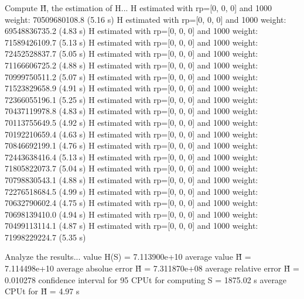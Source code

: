 Compute H̃, the estimation of H...
  H estimated with rp=[0, 0, 0] and 1000 weight:  70509680108.8  (5.16 s)
  H estimated with rp=[0, 0, 0] and 1000 weight:  69548836735.2  (4.83 s)
  H estimated with rp=[0, 0, 0] and 1000 weight:  71589426109.7  (5.13 s)
  H estimated with rp=[0, 0, 0] and 1000 weight:  72452528837.7  (5.05 s)
  H estimated with rp=[0, 0, 0] and 1000 weight:  71166606725.2  (4.88 s)
  H estimated with rp=[0, 0, 0] and 1000 weight:  70999750511.2  (5.07 s)
  H estimated with rp=[0, 0, 0] and 1000 weight:  71523829658.9  (4.91 s)
  H estimated with rp=[0, 0, 0] and 1000 weight:  72366055196.1  (5.25 s)
  H estimated with rp=[0, 0, 0] and 1000 weight:  70437119978.8  (4.83 s)
  H estimated with rp=[0, 0, 0] and 1000 weight:  70113755649.5  (4.92 s)
  H estimated with rp=[0, 0, 0] and 1000 weight:  70192210659.4  (4.63 s)
  H estimated with rp=[0, 0, 0] and 1000 weight:  70846692199.1  (4.76 s)
  H estimated with rp=[0, 0, 0] and 1000 weight:  72443638416.4  (5.13 s)
  H estimated with rp=[0, 0, 0] and 1000 weight:  71805822073.7  (5.04 s)
  H estimated with rp=[0, 0, 0] and 1000 weight:  70798830543.1  (4.88 s)
  H estimated with rp=[0, 0, 0] and 1000 weight:  72276518684.5  (4.99 s)
  H estimated with rp=[0, 0, 0] and 1000 weight:  70632790602.4  (4.75 s)
  H estimated with rp=[0, 0, 0] and 1000 weight:  70698139410.0  (4.94 s)
  H estimated with rp=[0, 0, 0] and 1000 weight:  70499113114.1  (4.87 s)
  H estimated with rp=[0, 0, 0] and 1000 weight:  71998229224.7  (5.35 s)

Analyze the results...
  value H(S)                  = 7.113900e+10 
  average value H̃             = 7.114498e+10 
  average absolue error H̃     = 7.311870e+08 
  average relative error H̃    = 0.010278 
  confidence interval for 95%
  CPUt for computing S         = 1875.02 s
  average CPUt for H̃           = 4.97 s


